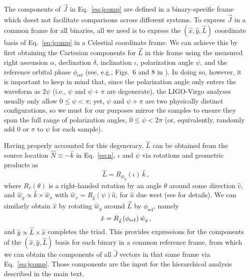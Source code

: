 \documentclass[aps,prd,twocolumn,superscriptaddress,preprintnumbers,floatfix,nofootinbib]{revtex4-2}
\begin{document}
The components of $\vec{J}$ in Eq.~\eqref{eq:jcomp} are defined in a binary-specific frame which doest not facilitate comparisons across different systems.
To express $\vec{J}$ in a common frame for all binaries, all we need is to express the $(\hat{x}, \hat{y}, \hat{L})$ coordinate basis of Eq.~\eqref{eq:jcomp} in a Celestial coordinate frame.
We can achieve this by first obtaining the Cartesian components for $\vec{L}$ in this frame using the measured right ascension $\alpha$, declination $\delta$, inclination $\iota$, polarization angle $\psi$, and the reference orbital phase $\phi_\mathrm{ref}$ (see, e.g., Figs.~6 and 8 in \cite{Isi:2022mbx}).
In doing so, however, it is important to keep in mind that, since the polarization angle only enters the waveform as $2\psi$ (i.e., $\psi$ and $\psi + \pi$ are degenerate), the LIGO-Virgo analyses usually only allow $0 \leq \psi < \pi$; yet, $\psi$ and $\psi + \pi$ are two physically distinct configurations, so we must for our purposes mirror the samples to ensure they span the full range of polarization angles, $0 \leq \psi < 2\pi$ (or, equivalently, randomly add $0$ or $\pi$ to $\psi$ for each sample).

Having properly accounted for this degeneracy, $\hat{L}$ can be obtained from the source location $\hat{N} \equiv - \hat{k}$ in Eq.~\eqref{eq:n}, $\iota$ and $\psi$ via rotations and geometric products as
\begin{equation}
\hat{L} = R_{\hat{w}_y}(\iota)\, \hat{k} \, ,
\end{equation}
where $R_{\hat{v}}(\theta)$ is a right-handed rotation by an angle $\theta$ around some direction $\hat{v}$, and $\hat{w}_y \propto \hat{k} \times \hat{w}_x$ with $\hat{w}_x = R_{\hat{k}}(\psi) \hat{u}$, for $\hat{u}$ due west (see \cite{Anderson:T010110} for details).
We can similarly obtain $\hat{x}$ by rotating $\hat{w}_y$ around $\vec{L}$ by $\phi_\mathrm{ref}$, namely
\begin{equation}
\hat{x} = R_{\hat{L}}(\phi_{\rm ref})\, \hat{w}_y \, ,
\end{equation}
and $\hat{y} \propto \hat{L} \times \hat{x}$ completes the triad.
This provides expressions for the components of the $(\hat{x}, \hat{y}, \hat{L})$ basis for each binary in a common reference frame, from which we can obtain the components of all $\hat{J}$ vectors in that same frame via Eq.~\eqref{eq:jcomp}.
Those components are the input for the hierarchical analysis described in the main text.
\end{document}
